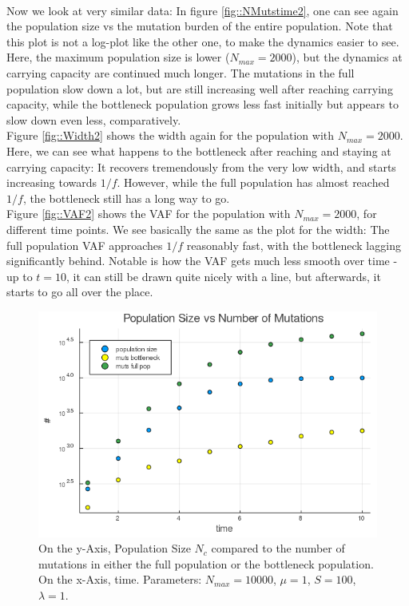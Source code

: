 \documentclass{article}
\numberwithin{equation}{subsection}
\begin{document}
	\\
	Now we look at very similar data: In figure \ref{fig::NMutstime2}, one can see again the population size vs the mutation burden of the entire population. Note that this plot is not a log-plot like the other one, to make the dynamics easier to see. Here, the maximum population size is lower ($ N_{max} = 2000$), but the dynamics at carrying capacity are continued much longer. The mutations in the full population slow down a lot, but are still increasing well after reaching carrying capacity, while the bottleneck population grows less fast initially but appears to slow down even less, comparatively.\\
	Figure \ref{fig::Width2} shows the width again for the population with $ N_{max} = 2000$. Here, we can see what happens to the bottleneck after reaching and staying at carrying capacity: It recovers tremendously from the very low width, and starts increasing towards $ 1/f $. However, while the full population has almost reached $ 1/f $, the bottleneck still has a long way to go. \\
	Figure \ref{fig::VAF2} shows the VAF for the population with $ N_{max} = 2000$, for different time points. We see basically the same as the plot for the width: The full population VAF approaches $ 1/f $ reasonably fast, with the bottleneck lagging significantly behind. Notable is how the VAF gets much less smooth over time - up to $ t = 10 $, it can still be drawn quite nicely with a line, but afterwards, it starts to go all over the place. \\
	
	\begin{figure}[h!]
		\centering
		\includegraphics[width=\linewidth]{Figures/LogGrowth/document/LogGrowthBasic/LogVarTimesMutLive_N10000_mu1_t10_d1_C0}

		\caption{On the y-Axis, Population Size $N_c$ compared to the number of mutations in either the full population or the bottleneck population. On the x-Axis, time. Parameters: $ N_{max} = 10000$, $\mu = 1 $, $ S = 100 $, $ \lambda = 1$.}
		\label{fig::NMutstime1}
	\end{figure}
\end{document}
